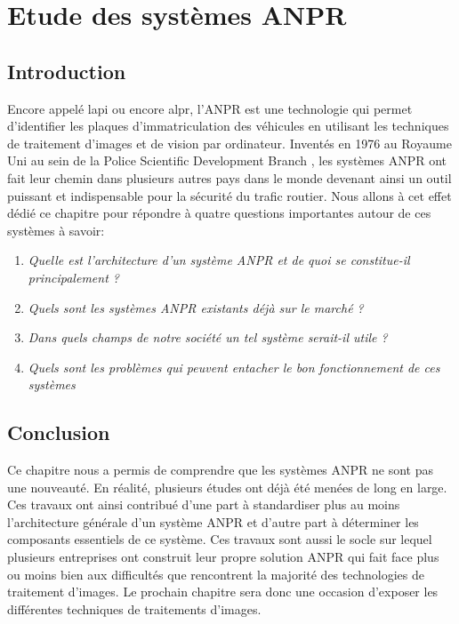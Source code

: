 \chapter{\textbf{Etude des systèmes ANPR}}
    \section{Introduction}
    Encore appelé \acrfull{lapi} ou encore \acrfull{alpr}, l’ANPR est une technologie qui permet d’identifier les plaques d’immatriculation des véhicules en utilisant les techniques de traitement d’images et de vision par ordinateur. Inventés en 1976 au Royaume Uni au sein de la Police Scientific Development Branch \cite{wikianpr}, les systèmes ANPR ont fait leur chemin dans plusieurs autres pays dans le monde devenant ainsi un outil puissant et indispensable pour la sécurité du trafic routier. Nous allons à cet effet dédié ce chapitre pour répondre à quatre questions importantes autour de ces systèmes à savoir:
        \begin{enumerate}
            \item \textit{Quelle est l’architecture d’un système ANPR et de quoi se constitue-il principalement ?}
            \item \textit{Quels sont les systèmes ANPR existants déjà sur le marché ?}
            \item \textit{Dans quels champs de notre société un tel système serait-il utile ?}
            \item \textit{Quels sont les problèmes qui peuvent entacher le bon fonctionnement de ces systèmes}
        \end{enumerate}

    
    
    
    


    \section{Conclusion}
    Ce chapitre nous a permis de comprendre que les systèmes ANPR ne sont pas une nouveauté. En réalité, plusieurs études ont déjà été menées de long en large. Ces travaux ont ainsi contribué d’une part à standardiser plus au moins l’architecture générale d’un système ANPR et d’autre part à déterminer les composants essentiels de ce système. Ces travaux sont aussi le socle sur lequel plusieurs entreprises ont construit leur propre solution ANPR qui fait face plus ou moins bien aux difficultés que rencontrent la majorité des technologies de traitement d’images. Le prochain chapitre sera donc une occasion d'exposer les différentes techniques de traitements d'images.